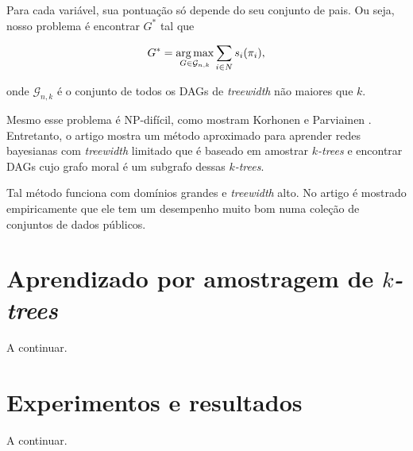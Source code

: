 Para cada variável, sua pontuação só depende do seu conjunto de pais. Ou seja, nosso problema é encontrar $G^*$ tal que

$$G^* = \operatorname*{arg\,max}_{G \in \mathcal{G}_{n,k}} \sum_{i \in N} s_i(\pi_i),$$

onde $\mathcal{G}_{n,k}$ é o conjunto de todos os DAGs de \emph{treewidth} não maiores que $k$.

Mesmo esse problema é NP-difícil, como mostram Korhonen e Parviainen \cite{korhonen}. Entretanto, o artigo \cite{maua} mostra um método aproximado para aprender redes bayesianas com \emph{treewidth} limitado que é baseado em amostrar \emph{$k$-trees} e encontrar DAGs cujo grafo moral é um subgrafo dessas \emph{$k$-trees}.

Tal método funciona com domínios grandes e \emph{treewidth} alto. No artigo é mostrado empiricamente que ele tem um desempenho muito bom numa coleção de conjuntos de dados públicos.

\section{Aprendizado por amostragem de \emph{$k$-trees}}

A continuar. %

\section{Experimentos e resultados}

A continuar. %
